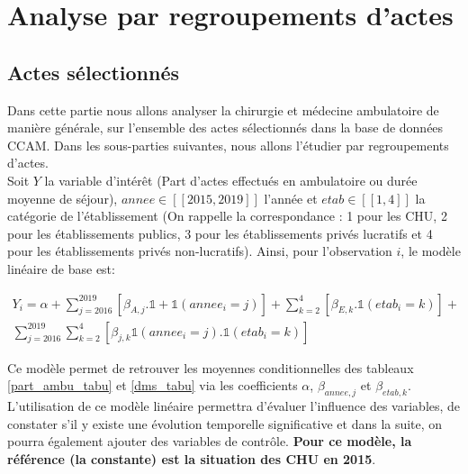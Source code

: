 \section{Analyse par regroupements d'actes}

\subsection{Actes sélectionnés} \label{section_2_1}



Dans cette partie nous allons analyser la chirurgie et médecine ambulatoire de manière générale, sur l'ensemble des actes sélectionnés dans la base de données CCAM. Dans les sous-parties suivantes, nous allons l'étudier par regroupements d'actes.\\

Soit $Y$ la variable d'intérêt (Part d'actes effectués en ambulatoire ou durée moyenne de séjour), $annee \in [\![2015,2019]\!]$ l'année et $etab \in [\![1,4]\!]$ la catégorie de l'établissement (On rappelle la correspondance : 1 pour les CHU, 2 pour les établissements publics, 3 pour les établissements privés lucratifs et 4 pour les établissements privés non-lucratifs). Ainsi, pour l'observation $i$, le modèle linéaire de base est:


\begin{multline}\label{eqn:equation_base}                                
  Y_i = \alpha + \sum_{j=2016}^{2019}[\beta_{A,j} . \mathbb{1+1}(annee_i=j)] +
\sum_{k=2}^{4}[\beta_{E,k} . \mathbb{1}(etab_i=k)] + \\
\sum_{j=2016}^{2019} \sum_{k=2}^{4}[\beta_{j,k}\mathbb{1}(annee_i=j).\mathbb{1}(etab_i=k)]
\end{multline} 

\bigskip

Ce modèle permet de retrouver les moyennes conditionnelles des tableaux \ref{part_ambu_tabu} et \ref{dms_tabu} via les coefficients $\alpha$, $\beta_{annee,j}$ et $\beta_{etab,k}$. L'utilisation de ce modèle linéaire permettra d'évaluer l'influence des variables, de constater s'il y existe une évolution temporelle significative et dans la suite, on pourra également ajouter des variables de contrôle. \textbf{Pour ce modèle, la référence (la constante) est la situation des CHU en 2015}.\\

